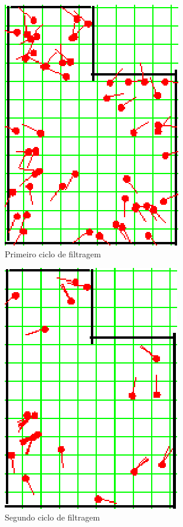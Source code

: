 \begin{figure}[H]
  \centering
  \includegraphics[scale=1]{figuras/cen2_ex5/2.eps}
  \caption[Primeiro Ciclo de Filtragem]{Primeiro ciclo de filtragem}
  \label{img:cen2_ex5_2}
\end{figure}

\begin{figure}[H]
  \centering
  \includegraphics[scale=1]{figuras/cen2_ex5/3.eps}
  \caption[Segundo Ciclo de Filtragem]{Segundo ciclo de filtragem}
  \label{img:cen2_ex5_3}
\end{figure}

